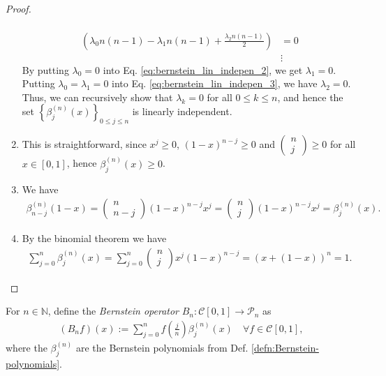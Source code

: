 \begin{proof}
\begin{enumerate}[label=(\alph*)]
\begin{align}
			\\ \left(\lambda_0n\left(n-1\right) - \lambda_1 n(n-1) + \frac{\lambda_2 n(n-1)}{2} \right) &= 0 \label{eq:bernstein_lin_indepen_3}
			\\ \nonumber  &\vdots 
		\end{align}
		By putting $\lambda_0 = 0$ into Eq. \eqref{eq:bernstein_lin_indepen_2}, we get $\lambda_1 = 0$. Putting $\lambda_0 = \lambda_1 = 0$ into Eq. \eqref{eq:bernstein_lin_indepen_3}, we have $\lambda_2 = 0$. Thus, we can recursively show that $\lambda_k = 0$ for all $0\leq k\leq n$, and hence the set $\left\{ \beta_{j}^{(n)}(x) \right\}_{0\leq j\leq n}$ is linearly independent. 
		
		\item This is straightforward, since $x^j\geq 0$, $(1 -x)^{n - j} \geq 0$ and $\begin{pmatrix}
			n \\ j
		\end{pmatrix} \geq 0$ for all $x\in [0, 1]$, hence $\beta_{j}^{(n)}(x) \geq 0$.
	
		\item We have
		\begin{align}
			\beta_{n-j}^{(n)}(1 - x) = \begin{pmatrix}
				n \\ n -j 
			\end{pmatrix}(1 - x)^{n - j}x^j = \begin{pmatrix}
				n \\ j 
			\end{pmatrix}(1 - x)^{n - j}x^j = \beta_{j}^{(n)}(x).		
		\end{align} 
	
		\item By the binomial theorem we have
		\begin{align}
			\sum_{j=0}^{n}\beta_{j}^{(n)}(x) = \sum_{j=0}^{n}\begin{pmatrix}
				n \\ j
			\end{pmatrix}x^j(1-x)^{n-j} = (x + (1-x))^n = 1.
		\end{align}
	\end{enumerate}		
\end{proof}

\begin{defn}\label{defn:Bernstein-operators}
	For $n\in\mathbb N$, define the \textit{Bernstein operator} $B_n: \mathcal C[0, 1]\to \mathcal P_n$ as 
	\begin{align}\label{eq:bernstein_operator}
		\left(B_nf\right)(x) := \sum_{j=0}^{n}f\left(\frac{j}{n}\right)\beta_{j}^{(n)}(x) \quad \forall f\in\mathcal C[0, 1],
	\end{align}
	where the $\beta_{j}^{(n)}$ are the Bernstein polynomials from Def. \ref{defn:Bernstein-polynomials}.
\end{defn}

